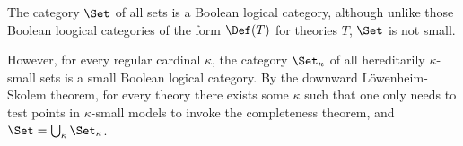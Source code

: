 \documentclass[11pt]{article}
\begin{document}

  The category $\Set$ of all sets is a Boolean logical category, although unlike those Boolean loogical categories of the form $\Def(T)$ for theories $T$, $\Set$ is not small.

  However, for every regular cardinal $\kappa$, the category $\Set_{\kappa}$ of all hereditarily $\kappa$-small sets is a small Boolean logical category. By the downward L\"owenheim-Skolem theorem, for every theory there exists some $\kappa$ such that one only needs to test points in $\kappa$-small models to invoke the completeness theorem, and $\Set = \bigcup_{\kappa} \Set_{\kappa}$.

\end{document}
